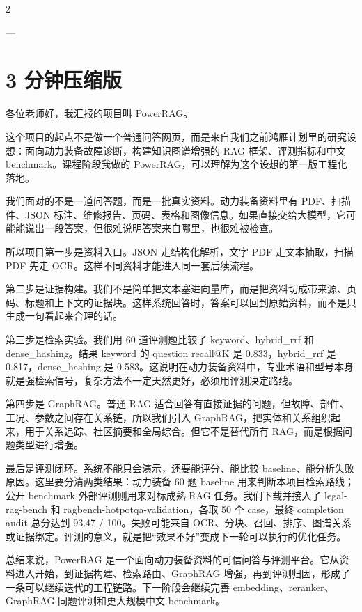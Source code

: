 \documentclass[10pt, a4paper]{ctexart}
\begin{document}
\begin{multicols}{2}

\linespread{1.0}\selectfont\footnotesize

---

\section*{3 分钟压缩版}


各位老师好，我汇报的项目叫 PowerRAG。

这个项目的起点不是做一个普通问答网页，而是来自我们之前鸿雁计划里的研究设想：面向动力装备故障诊断，构建知识图谱增强的 RAG 框架、评测指标和中文 benchmark。课程阶段我做的 PowerRAG，可以理解为这个设想的第一版工程化落地。

我们面对的不是一道问答题，而是一批真实资料。动力装备资料里有 PDF、扫描件、JSON 标注、维修报告、页码、表格和图像信息。如果直接交给大模型，它可能能说出一段答案，但很难说明答案来自哪里，也很难被检查。

所以项目第一步是资料入口。JSON 走结构化解析，文字 PDF 走文本抽取，扫描 PDF 先走 OCR。这样不同资料才能进入同一套后续流程。

第二步是证据构建。我们不是简单把文本塞进向量库，而是把资料切成带来源、页码、标题和上下文的证据块。这样系统回答时，答案可以回到原始资料，而不是只生成一句看起来合理的话。

第三步是检索实验。我们用 60 道评测题比较了 keyword、hybrid\_rrf 和 dense\_hashing。结果 keyword 的 question recall@K 是 0.833，hybrid\_rrf 是 0.817，dense\_hashing 是 0.583。这说明在动力装备资料中，专业术语和型号本身就是强检索信号，复杂方法不一定天然更好，必须用评测决定路线。

第四步是 GraphRAG。普通 RAG 适合回答有直接证据的问题，但故障、部件、工况、参数之间存在关系链，所以我们引入 GraphRAG，把实体和关系组织起来，用于关系追踪、社区摘要和全局综合。但它不是替代所有 RAG，而是根据问题类型进行增强。

最后是评测闭环。系统不能只会演示，还要能评分、能比较 baseline、能分析失败原因。这里要分清两类结果：动力装备 60 题 baseline 用来判断本项目检索路线；公开 benchmark 外部评测则用来对标成熟 RAG 任务。我们下载并接入了 legal-rag-bench 和 ragbench-hotpotqa-validation，各取 50 个 case，最终 completion audit 总分达到 93.47 / 100。失败可能来自 OCR、分块、召回、排序、图谱关系或证据绑定。评测的意义，就是把“效果不好”变成下一轮可以执行的优化任务。

总结来说，PowerRAG 是一个面向动力装备资料的可信问答与评测平台。它从资料进入开始，到证据构建、检索路由、GraphRAG 增强，再到评测归因，形成了一条可以继续迭代的工程链路。下一阶段会继续完善 embedding、reranker、GraphRAG 同题评测和更大规模中文 benchmark。


\end{multicols}
\end{document}
